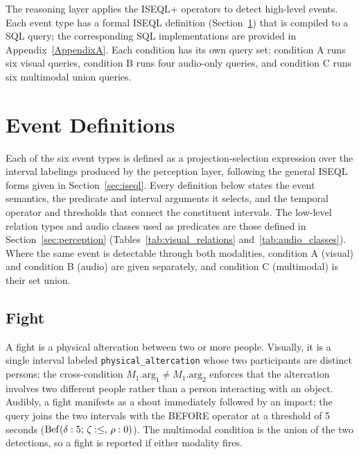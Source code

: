 The reasoning layer applies the ISEQL+ operators to detect high-level events. Each event type has a formal ISEQL definition (Section~\ref{sec:event-definitions}) that is compiled to a SQL query; the corresponding SQL implementations are provided in Appendix~\ref{AppendixA}. Each condition has its own query set: condition A runs six visual queries, condition B runs four audio-only queries, and condition C runs six multimodal union queries.

\section{Event Definitions}
\label{sec:event-definitions}

Each of the six event types is defined as a projection-selection expression over the interval labelings produced by the perception layer, following the general ISEQL forms given in Section~\ref{sec:iseql}. Every definition below states the event semantics, the predicate and interval arguments it selects, and the temporal operator and thresholds that connect the constituent intervals. The low-level relation types and audio classes used as predicates are those defined in Section~\ref{sec:perception} (Tables~\ref{tab:visual_relations} and~\ref{tab:audio_classes}). Where the same event is detectable through both modalities, condition A (visual) and condition B (audio) are given separately, and condition C (multimodal) is their set union.

\subsection{Fight}

A fight is a physical altercation between two or more people. Visually, it is a single interval labeled \texttt{physical\_altercation} whose two participants are distinct persons; the cross-condition $M_1.\mathrm{arg}_1 \neq M_1.\mathrm{arg}_2$ enforces that the altercation involves two different people rather than a person interacting with an object. Audibly, a fight manifests as a shout immediately followed by an impact; the query joins the two intervals with the BEFORE operator at a threshold of 5 seconds ($\mathrm{Bef}(\delta:5;\,\zeta:\le,\,\rho:0)$). The multimodal condition is the union of the two detections, so a fight is reported if either modality fires.

